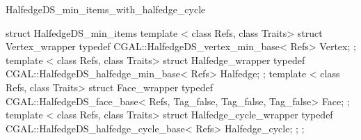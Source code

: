 \begin{ccRefClass}{HalfedgeDS_min_items_with_halfedge_cycle}
\begin{ccExampleCode}
struct HalfedgeDS_min_items {
    template < class Refs, class Traits>
    struct Vertex_wrapper {
        typedef CGAL::HalfedgeDS_vertex_min_base< Refs>   Vertex;
    };
    template < class Refs, class Traits>
    struct Halfedge_wrapper {
        typedef CGAL::HalfedgeDS_halfedge_min_base< Refs> Halfedge;
    };
    template < class Refs, class Traits>
    struct Face_wrapper {
        typedef CGAL::HalfedgeDS_face_base< Refs, Tag_false, Tag_false, Tag_false> Face;
    };
    template < class Refs, class Traits>
    struct Halfedge_cycle_wrapper {
        typedef CGAL::HalfedgeDS_halfedge_cycle_base< Refs>  Halfedge_cycle;
    };
};
\end{ccExampleCode}

\end{ccRefClass}

\ccRefPageEnd

